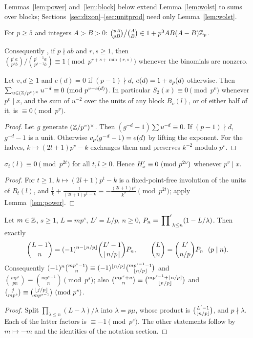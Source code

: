 \documentclass[11pt]{amsart}
\begin{document}
Lemmas~\ref{lem:power} and~\ref{lem:block} below extend Lemma~\ref{lem:wolst} to sums over blocks; Sections~\ref{sec:dixon}--\ref{sec:unitprod} need only Lemma~\ref{lem:wolst}.

\begin{lemma}\label{lem:kaz}
For $p\ge5$ and integers $A>B>0$: $\binom{pA}{pB}\big/\binom AB\in1+p^3AB(A-B)\mathbb{Z}_{p}$.
\end{lemma}
Consequently \cite[Lemma 2.1]{oss2016}, if $p\nmid ab$ and $r,s\ge1$, then $\binom{p^ra}{p^sb}\big/\binom{p^{r-1}a}{p^{s-1}b}\equiv1\pmod{p^{r+s+\min(r,s)}}$ whenever the binomials are nonzero.

\begin{lemma}\label{lem:power}
Let $v,d\ge1$ and $e(d)=0$ if $(p-1)\nmid d$, $e(d)=1+v_p(d)$ otherwise. Then $\sum_{u\in(\mathbb{Z}/p^v)^\times}u^{-d}\equiv0\ (\mathrm{mod}\ p^{v-e(d)})$. In particular $S_2(x)\equiv0\pmod{p^v}$ whenever $p^v\mid x$, and the sum of $u^{-2}$ over the units of any block $B_v(l)$, or of either half of it, is $\equiv0\pmod{p^v}$.
\end{lemma}
\begin{proof}
Let $g$ generate $(\mathbb{Z}/p^v)^\times$. Then $(g^{-d}-1)\sum u^{-d}\equiv0$. If $(p-1)\nmid d$, $g^{-d}-1$ is a unit. Otherwise $v_p(g^{-d}-1)=e(d)$ by lifting the exponent. For the halves, $k\mapsto(2l+1)p^v-k$ exchanges them and preserves $k^{-2}$ modulo $p^v$.
\end{proof}

\begin{lemma}\label{lem:block}
$\sigma_t(l)\equiv0\pmod{p^{2t}}$ for all $t,l\ge0$. Hence $H'_x\equiv0\ (\mathrm{mod}\ p^{2v})$ whenever $p^v\mid x$.
\end{lemma}
\begin{proof}
For $t\ge1$, $k\mapsto(2l+1)p^t-k$ is a fixed-point-free involution of the units of $B_t(l)$, and $\frac1k+\frac1{(2l+1)p^t-k}\equiv-\frac{(2l+1)p^t}{k^2}\pmod{p^{2t}}$; apply Lemma~\ref{lem:power}.
\end{proof}

\begin{lemma}\label{lem:digit}
Let $m\in\mathbb{Z}$, $s\ge1$, $L=mp^s$, $L'=L/p$, $n\ge0$, $P_n=\sideset{}{'}\prod_{\lambda\le n}(1-L/\lambda)$. Then exactly
\[ \binom{L-1}n=(-1)^{n-\left\lfloor n/p\right\rfloor}\binom{L'-1}{\left\lfloor n/p\right\rfloor}P_n,\qquad \binom{L}{n}=\binom{L'}{n/p}P_n\ \ (p\mid n). \]
Consequently $(-1)^n\binom{mp^s-1}{n}\equiv(-1)^{\left\lfloor n/p\right\rfloor}\binom{mp^{s-1}-1}{\left\lfloor n/p\right\rfloor}$ and $\binom{mp^s}{pn}\equiv\binom{mp^{s-1}}{n}\pmod{p^s}$; also $\binom{mp^s+n}{n}\equiv\binom{mp^{s-1}+\left\lfloor n/p\right\rfloor}{\left\lfloor n/p\right\rfloor}$ and $\binom{j}{mp^s}\equiv\binom{\left\lfloor j/p\right\rfloor}{mp^{s-1}}\ (\mathrm{mod}\ p^s)$.
\end{lemma}
\begin{proof}
Split $\prod_{\lambda\le n}(L-\lambda)/\lambda$ into $\lambda=p\mu$, whose product is $\binom{L'-1}{\left\lfloor n/p\right\rfloor}$, and $p\nmid\lambda$. Each of the latter factors is $\equiv-1\pmod{p^s}$. The other statements follow by $m\mapsto-m$ and the identities of the notation section.
\end{proof}
\end{document}
